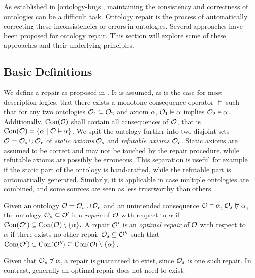 
As established in \cref{ontology-bugs}, maintaining the consistency and correctness of ontologies can be a difficult task. Ontology repair is the process of automatically correcting these inconsistencies or errors in ontologies. Several approaches have been proposed for ontology repair.  This section will explore some of these approaches and their underlying principles.

\subsection{Basic Definitions} \label{basic-definitions}

We define a repair as proposed in \cite{baader2018making}. It is assumed, as is the case for most description logics, that there exists a monotone consequence operator $\vDash$ such that for any two ontologies $\mathcal{O}_1 \subseteq \mathcal{O}_2$ and axiom $\alpha$, $\mathcal{O}_1 \vDash \alpha$ implies $\mathcal{O}_2 \vDash \alpha$. Additionally, $\mathrm{Con}(\mathcal{O})$ shall contain all consequences of $\mathcal{O}$, that is $\mathrm{Con}(\mathcal{O}) = \{ \alpha \mid \mathcal{O} \vDash \alpha \}$. We split the ontology further into two disjoint sets $\mathcal{O} = \mathcal{O}_s \cup \mathcal{O}_r$ of \emph{static axioms} $\mathcal{O}_s$ and \emph{refutable axioms} $\mathcal{O}_r$. Static axioms are assumed to be correct and may not be touched by the repair procedure, while refutable axioms are possibly be erroneous. This separation is useful for example if the static part of the ontology is hand-crafted, while the refutable part is automatically generated. Similarly, it is applicable in case multiple ontologies are combined, and some sources are seen as less trustworthy than others.

\begin{definition}
Given an ontology $\mathcal{O} = \mathcal{O}_s \cup \mathcal{O}_r$ and an unintended consequence $\mathcal{O} \vDash \alpha$, $\mathcal{O}_s \not\vDash \alpha$, the ontology $\mathcal{O}_s \subseteq \mathcal{O}'$ is a \emph{repair} of $\mathcal{O}$ with respect to $\alpha$ if $\mathrm{Con}(\mathcal{O}') \subseteq \mathrm{Con}(\mathcal{O}) \setminus \{\alpha\}.$ A repair $\mathcal{O}'$ is an \emph{optimal repair} of $\mathcal{O}$ with respect to $\alpha$ if there exists no other repair $\mathcal{O}_s \subseteq \mathcal{O}''$ such that $\mathrm{Con}(\mathcal{O}') \subset \mathrm{Con}(\mathcal{O}'') \subseteq \mathrm{Con}(\mathcal{O}) \setminus \{\alpha\}$.
\end{definition}

Given that $\mathcal{O}_s \not\vDash \alpha$, a repair is guaranteed to exist, since $\mathcal{O}_s$ is one such repair. In contrast, generally an optimal repair does not need to exist.

